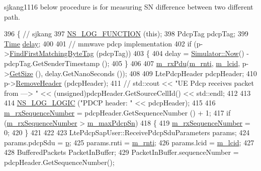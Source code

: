 sjkang1116 below procedure is for measuring SN difference between two different path. 
\begin{DoxyCode}
396                                              \{ \textcolor{comment}{// sjkang}
397   \hyperlink{log-macros-disabled_8h_a90b90d5bad1f39cb1b64923ea94c0761}{NS\_LOG\_FUNCTION} (\textcolor{keyword}{this});
398   PdcpTag pdcpTag;
399   \hyperlink{namespacens3_1_1TracedValueCallback_a7ffd3e7c142ffe7c8a1d2db9b8de38ec}{Time} \hyperlink{lte_2model_2fading-traces_2fading__trace__generator_8m_a7964e6aa8f61a9d28973c8267a606ad8}{delay};
400 
401   \textcolor{comment}{// mmwave pdcp implementation}
402   \textcolor{keywordflow}{if} (p->\hyperlink{classns3_1_1Packet_a2e1403c2411495827012fe000823c16a}{FindFirstMatchingByteTag} (pdcpTag))
403   \{
404     delay = \hyperlink{classns3_1_1Simulator_ac3178fa975b419f7875e7105be122800}{Simulator::Now}() - pdcpTag.GetSenderTimestamp ();
405   \}
406 
407   \hyperlink{classns3_1_1McUePdcp_abc1e053fc92c4e96633a914c8ef5ed53}{m\_rxPdu}(\hyperlink{classns3_1_1McUePdcp_a5807c425f6989fee6982fc11fdb5e9a9}{m\_rnti}, \hyperlink{classns3_1_1McUePdcp_ad68b36aee03df89a1d476f78c0db4bbc}{m\_lcid}, p->\hyperlink{classns3_1_1Packet_a462855c9929954d4301a4edfe55f4f1c}{GetSize} (), delay.GetNanoSeconds ());
408 
409   LtePdcpHeader pdcpHeader;
410   p->\hyperlink{classns3_1_1Packet_a0961eccf975d75f902d40956c93ba63e}{RemoveHeader} (pdcpHeader);
411  \textcolor{comment}{// std::cout << "UE Pdcp receives packet from ---> " << (unsigned)pdcpHeader.GetSourceCellId() <<
       std::endl;}
412 
413 
414   \hyperlink{group__logging_ga88acd260151caf2db9c0fc84997f45ce}{NS\_LOG\_LOGIC} (\textcolor{stringliteral}{"PDCP header: "} << pdcpHeader);
415 
416   \hyperlink{classns3_1_1McUePdcp_aa6a0c17d882c9b646ed631235c7d6ee1}{m\_rxSequenceNumber} = pdcpHeader.GetSequenceNumber () + 1;
417   \textcolor{keywordflow}{if} (\hyperlink{classns3_1_1McUePdcp_aa6a0c17d882c9b646ed631235c7d6ee1}{m\_rxSequenceNumber} > \hyperlink{classns3_1_1McUePdcp_ab397f1cb87dfd3d4362f6d58adf968bc}{m\_maxPdcpSn})
418   \{
419     \hyperlink{classns3_1_1McUePdcp_aa6a0c17d882c9b646ed631235c7d6ee1}{m\_rxSequenceNumber} = 0;
420   \}
421 
422 
423   LtePdcpSapUser::ReceivePdcpSduParameters params;
424   params.pdcpSdu = \hyperlink{lte__link__budget_8m_ac9de518908a968428863f829398a4e62}{p};
425   params.rnti = \hyperlink{classns3_1_1McUePdcp_a5807c425f6989fee6982fc11fdb5e9a9}{m\_rnti};
426   params.lcid = \hyperlink{classns3_1_1McUePdcp_ad68b36aee03df89a1d476f78c0db4bbc}{m\_lcid};
427 
428   BufferedPackets PacketInBuffer;
429   PacketInBuffer.sequenceNumber = pdcpHeader.GetSequenceNumber();

\end{DoxyCode}
